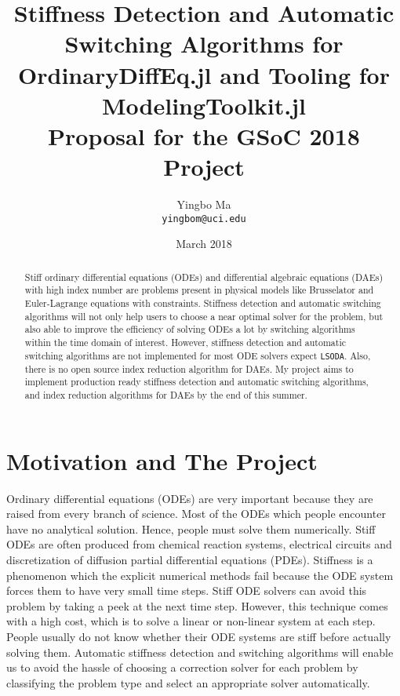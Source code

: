 \documentclass[12pt,a4paper]{article}
\author{Yingbo Ma \\ \tt{yingbom@uci.edu}}
\date{March 2018}
\title{Stiffness Detection and Automatic Switching Algorithms for
OrdinaryDiffEq.jl and Tooling for ModelingToolkit.jl \\
\large{Proposal for the GSoC 2018 Project}}
\begin{document}
\maketitle

\begin{abstract}
  Stiff ordinary differential equations (ODEs) and differential algebraic
  equations (DAEs) with high index number are problems present in physical
  models like Brusselator and Euler-Lagrange equations with constraints.
  Stiffness detection and automatic switching algorithms will not only help
  users to choose a near optimal solver for the problem, but also able to
  improve the efficiency of solving ODEs a lot by switching algorithms within
  the time domain of interest. However, stiffness detection and automatic
  switching algorithms are not implemented for most ODE solvers expect
  \texttt{LSODA}. Also, there is no open source index reduction algorithm for
  DAEs. My project aims to implement production ready stiffness detection and
  automatic switching algorithms, and index reduction algorithms for DAEs by
  the end of this summer.
\end{abstract}

\section{Motivation and The Project}
Ordinary differential equations (ODEs) are very important because they are
raised from every branch of science. Most of the ODEs which people encounter
have no analytical solution. Hence, people must solve them numerically. Stiff
ODEs are often produced from chemical reaction systems, electrical circuits and
discretization of diffusion partial differential equations (PDEs). Stiffness
is a phenomenon which the explicit numerical methods fail because the ODE
system forces them to have very small time steps. Stiff ODE solvers can avoid
this problem by taking a peek at the next time step. However, this technique
comes with a high cost, which is to solve a linear or non-linear system at each
step. People usually do not know whether their ODE systems are stiff before
actually solving them. Automatic stiffness detection and switching algorithms
will enable us to avoid the hassle of choosing a correction solver for each
problem by classifying the problem type and select an appropriate solver
automatically.
\end{document}
